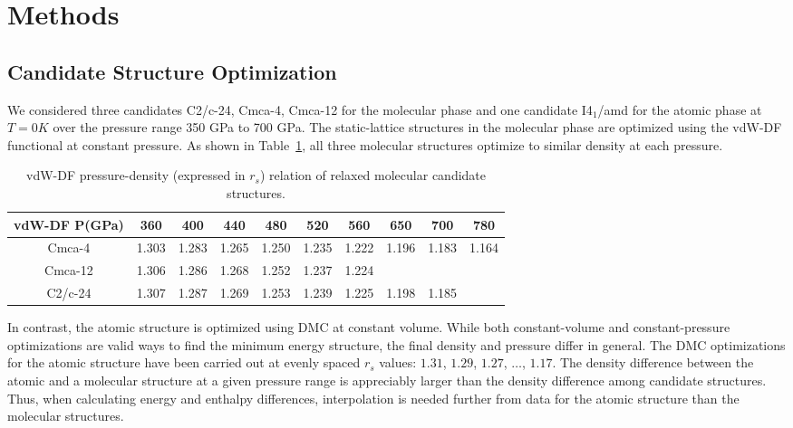 \section{Methods}
\label{sec:hsolid-methods}

\subsection{Candidate Structure Optimization}
We considered three candidates C2/c-24, Cmca-4, Cmca-12 for the molecular phase and one candidate I4$_1$/amd for the atomic phase at $T=0K$ over the pressure range 350 GPa to 700 GPa. The static-lattice structures in the molecular phase are optimized using the vdW-DF functional at constant pressure.
As shown in Table~\ref{tab:hsolid-mol-press-rs}, all three molecular structures optimize to similar density at each pressure.
\begin{table}[h]
\centering
\begin{tabular}{cccccccccc}
\toprule
vdW-DF P(GPa) & 360 & 400 & 440 & 480 & 520 & 560 & 650 & 700 & 780 \\
\midrule
Cmca-4  & 1.303 & 1.283 & 1.265 & 1.250 & 1.235 & 1.222 & 1.196 & 1.183 & 1.164 \\
Cmca-12 & 1.306 & 1.286 & 1.268 & 1.252 & 1.237 & 1.224 & & & \\
C2/c-24 & 1.307 & 1.287 & 1.269 & 1.253 & 1.239 & 1.225 & 1.198 & 1.185 & \\
\bottomrule
\end{tabular}
\caption{vdW-DF pressure-density (expressed in $r_s$) relation of relaxed molecular candidate structures.}
\label{tab:hsolid-mol-press-rs}
\end{table}
In contrast, the atomic structure is optimized using DMC at constant volume.
While both constant-volume and constant-pressure optimizations are valid ways to find the minimum energy structure, the final density and pressure differ in general.
The DMC optimizations for the atomic structure have been carried out at evenly spaced $r_s$ values: $1.31$, $1.29$, $1.27$, $\dots$, $1.17$.
The density difference between the atomic and a molecular structure at a given pressure range is appreciably larger than the density difference among candidate structures.
Thus, when calculating energy and enthalpy differences, interpolation is needed further from data for the atomic structure than the molecular structures.

